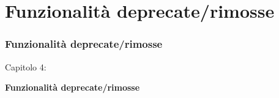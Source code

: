 %

\section{Funzionalità deprecate/rimosse}
\begin{frame}[fragile]
	\frametitle{Funzionalità deprecate/rimosse}

	\begin{center}\huge{Capitolo 4:}\end{center}
	\begin{center}\huge{\color{typo3darkgrey}\textbf{Funzionalità deprecate/rimosse}}\end{center}

\end{frame}


